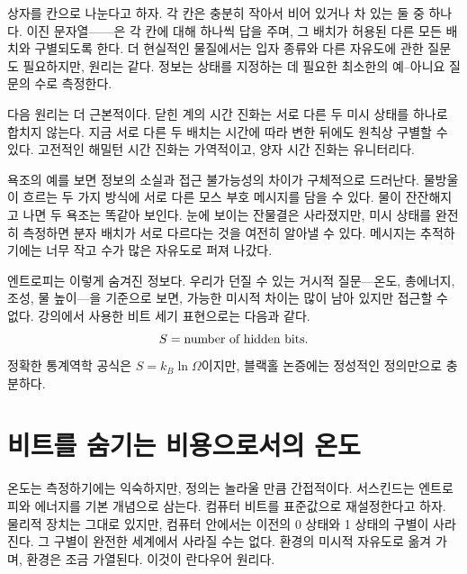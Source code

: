 상자를 칸으로 나눈다고 하자. 각 칸은 충분히 작아서 비어 있거나 차 있는 둘 중 하나다. 이진 문자열------은 각 칸에 대해 하나씩 답을 주며, 그 배치가 허용된 다른 모든 배치와 구별되도록 한다. 더 현실적인 물질에서는 입자 종류와 다른 자유도에 관한 질문도 필요하지만, 원리는 같다. 정보는 상태를 지정하는 데 필요한 최소한의 예--아니요 질문의 수로 측정한다.

\begin{classroomqa}\end{classroomqa}

다음 원리는 더 근본적이다. 닫힌 계의 시간 진화는 서로 다른 두 미시 상태를 하나로 합치지 않는다. 지금 서로 다른 두 배치는 시간에 따라 변한 뒤에도 원칙상 구별할 수 있다. 고전적인 해밀턴 시간 진화는 가역적이고, 양자 시간 진화는 유니터리다.

욕조의 예를 보면 정보의 소실과 접근 불가능성의 차이가 구체적으로 드러난다. 물방울이 흐르는 두 가지 방식에 서로 다른 모스 부호 메시지를 담을 수 있다. 물이 잔잔해지고 나면 두 욕조는 똑같아 보인다. 눈에 보이는 잔물결은 사라졌지만, 미시 상태를 완전히 측정하면 분자 배치가 서로 다르다는 것을 여전히 알아낼 수 있다. 메시지는 추적하기에는 너무 작고 수가 많은 자유도로 퍼져 나갔다.

엔트로피는 이렇게 숨겨진 정보다. 우리가 던질 수 있는 거시적 질문---온도, 총에너지, 조성, 물 높이---을 기준으로 보면, 가능한 미시적 차이는 많이 남아 있지만 접근할 수 없다. 강의에서 사용한 비트 세기 표현으로는 다음과 같다.
\begin{equation}
S=\hbox{number of hidden bits}.
\end{equation}
정확한 통계역학 공식은 \(S=k_B\ln\Omega\)이지만, 블랙홀 논증에는 정성적인 정의만으로 충분하다.

\section{비트를 숨기는 비용으로서의 온도}

온도는 측정하기에는 익숙하지만, 정의는 놀라울 만큼 간접적이다. 서스킨드는 엔트로피와 에너지를 기본 개념으로 삼는다. 컴퓨터 비트를 표준값으로 재설정한다고 하자. 물리적 장치는 그대로 있지만, 컴퓨터 안에서는 이전의 0 상태와 1 상태의 구별이 사라진다. 그 구별이 완전한 세계에서 사라질 수는 없다. 환경의 미시적 자유도로 옮겨 가며, 환경은 조금 가열된다. 이것이 란다우어 원리다.

